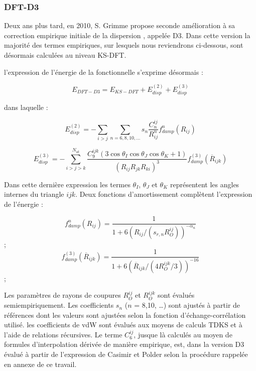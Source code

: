 \subsubsection{DFT-D3}

Deux ans plus tard, en 2010, S. Grimme \cite{grimme2006semiempirical} propose seconde amélioration à sa correction empirique initiale de la dispersion \cite{grimme2004accurate}, appelée D3. Dans cette version la majorité des termes empiriques, sur lesquels nous reviendrons ci-dessous, sont désormais calculées au niveau KS-DFT.
 
l’expression de l'énergie de la fonctionnelle s’exprime désormais :

\begin{equation}
E_{DFT-D3} = E_{KS-DFT} + E_{disp}^{(2)} + E_{disp}^{(3)}
\end{equation}

dans laquelle : 

\begin{equation}
E_{disp}^{(2)}=- \sum_{i>j} \sum_{n=6,8,10,…} s_{n} \frac{C_{n}^{ij}}{R_{ij}^{n}} f_{damp}^{n} (R_{ij})
\end{equation}

\begin{equation}
E_{disp}^{(3)}= -\sum_{i>j>k}^{N_{at}} \frac{C_{9}^{ijk}(3\cos\theta_{I}\cos\theta_{J}\cos\theta_{K}+ 1)}{(R_{ij} R_{jk} R_{ki})^{3}} f_{damp}^{(3)} (\overline{R}_{ijk})
\end{equation}

Dans cette dernière expression les termes $\theta_{I}$, $\theta_{J}$ et $\theta_{K}$ représentent les angles internes du triangle $ijk$. Deux fonctions d'amortissement complètent l’expression de l’énergie :

\begin{multicols}
\begin{equation} f_{damp}^{n} (R_{ij}) =\frac{1}{1+6(R_{ij} / (s_{r,n} R_{O}^{ij}))^{-\alpha_{n}}} \end{equation}   ;  
\begin{equation} f_{damp}^{(3)} (\overline{R}_{ijk}) =\frac{1}{1+6(\overline{R}_{ijk} / (4 R_{O}^{ijk}/3))^{-16}}\end{equation}; 
\end{multicols}

Les paramètres de rayons de coupures $R_{O}^{ij}$ et $R_{O}^{ijk}$ sont évalués semiempiriquement. Les coefficients $s_{n}$ ($n$ = 8,10, \dots) sont ajustés à partir de références dont les valeurs sont ajustées selon la fonction d’échange-corrélation utilisé. les coefficients de vdW sont évalués aux moyens de calculs TDKS et à l’aide de relations récursives. Le terme $C_{6}^{ij}$, jusque là calculés au moyen de formules d’interpolation dérivée de manière empirique, est, dans la version D3 évalué à partir de l’expression de Casimir et Polder selon la procédure rappelée en annexe de ce travail.

